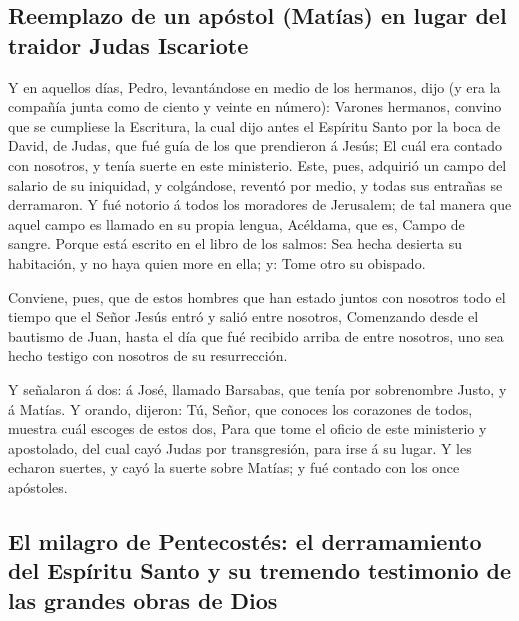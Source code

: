 \hypertarget{reemplazo-de-un-apuxf3stol-matuxedas-en-lugar-del-traidor-judas-iscariote}{%
\subsection{Reemplazo de un apóstol (Matías) en lugar del traidor Judas
Iscariote}\label{reemplazo-de-un-apuxf3stol-matuxedas-en-lugar-del-traidor-judas-iscariote}}

 Y en aquellos días, Pedro, levantándose en medio de los
hermanos, dijo (y era la compañía junta como de ciento y veinte en
número):  Varones hermanos, convino que se cumpliese la
Escritura, la cual dijo antes el Espíritu Santo por la boca de David, de
Judas, que fué guía de los que prendieron á Jesús;  El
cuál era contado con nosotros, y tenía suerte en este ministerio.
 Este, pues, adquirió un campo del salario de su
iniquidad, y colgándose, reventó por medio, y todas sus entrañas se
derramaron.  Y fué notorio á todos los moradores de
Jerusalem; de tal manera que aquel campo es llamado en su propia lengua,
Acéldama, que es, Campo de sangre.  Porque está escrito
en el libro de los salmos: Sea hecha desierta su habitación, y no haya
quien more en ella; y: Tome otro su obispado.

 Conviene, pues, que de estos hombres que han estado
juntos con nosotros todo el tiempo que el Señor Jesús entró y salió
entre nosotros,  Comenzando desde el bautismo de Juan,
hasta el día que fué recibido arriba de entre nosotros, uno sea hecho
testigo con nosotros de su resurrección.

 Y señalaron á dos: á José, llamado Barsabas, que tenía
por sobrenombre Justo, y á Matías.  Y orando, dijeron:
Tú, Señor, que conoces los corazones de todos, muestra cuál escoges de
estos dos,  Para que tome el oficio de este ministerio y
apostolado, del cual cayó Judas por transgresión, para irse á su lugar.
 Y les echaron suertes, y cayó la suerte sobre Matías; y
fué contado con los once apóstoles.

\hypertarget{el-milagro-de-pentecostuxe9s-el-derramamiento-del-espuxedritu-santo-y-su-tremendo-testimonio-de-las-grandes-obras-de-dios}{%
\subsection{El milagro de Pentecostés: el derramamiento del Espíritu
Santo y su tremendo testimonio de las grandes obras de
Dios}\label{el-milagro-de-pentecostuxe9s-el-derramamiento-del-espuxedritu-santo-y-su-tremendo-testimonio-de-las-grandes-obras-de-dios}}

